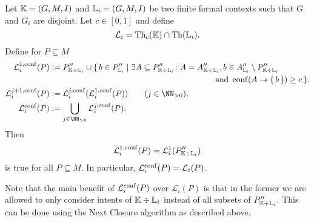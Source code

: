 \begin{Proposition}
  \label{prop:computing-confident-closure-second-try}
  Let ${\mathbb{K}} = (G, M, I)$ and ${\mathbb{L}}_{i} = (G, M, I)$ be two finite formal contexts such
  that $G$ and $G_{i}$ are disjoint.  Let $c \in [0,1]$ and define
  \begin{equation*}
    \mathcal{L}_{i} = \operatorname{Th}_{c}({\mathbb{K}}) \cap \operatorname{Th}({\mathbb{L}}_{i}).
  \end{equation*}
  Define for $P \subseteq M$
  \begin{align*}
    \mathcal{L}_{i}^{1,\conf}(P) &:= P_{\con K \div \con L_{i}}'' \cup \{\, b \in P_{\con
      L_{i}}'' \mid \exists A \subseteq P_{\con K \div \con L_{i}}'' \st A = A_{\con K
      \div \con L_{i}}'', b \in A_{\con L_{i}}'' \setminus
    P_{\con K \div \con L_{i}}''\\ &\hspace*{20em} \text{ and } \conf(A \to \set{b}) \ge c
    \,\}.\\
    \mathcal{L}_{i}^{j+1,\conf}(P) &:=
    \mathcal{L}_{i}^{j,\conf}(\mathcal{L}_{i}^{1,\conf}(P)) \qquad (j \in \NN_{>0}),\\
    \mathcal{L}_{i}^{\conf}(P) &:= \bigcup_{j \in \NN_{>0}} \mathcal{L}_{i}^{j,\conf}(P).
  \end{align*}
  Then
  \begin{equation*}
    \mathcal{L}_{i}^{1,\operatorname{conf}}(P) = \mathcal{L}_{i}^{1}(P_{{\mathbb{K}} \div {\ensuremath{\mathbb{L}}}_{i}}'')
  \end{equation*}
  is true for all $P \subseteq M$.  In particular, $\mathcal{L}_{i}^{\operatorname{conf}}(P) =
  \mathcal{L}_{i}(P)$.
\end{Proposition}

Note that the main benefit of $\mathcal{L}_{i}^{\operatorname{conf}}(P)$ over $\mathcal{L}_{i}(P)$ is
that in the former we are allowed to only consider intents of ${\mathbb{K}} \div {\ensuremath{\mathbb{L}}}_{i}$
instead of all subsets of $P_{{\mathbb{K}} \div {\ensuremath{\mathbb{L}}}_{i}}''$.  This can be done using the Next
Closure algorithm as described above.

